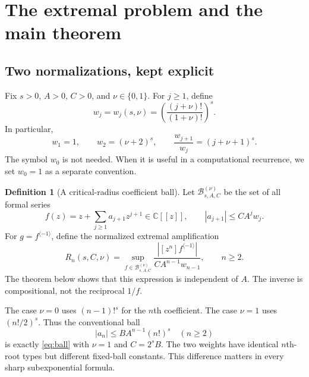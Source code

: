 \documentclass[11pt,a4paper]{article}
\theoremstyle{definition}
\newtheorem{definition}[theorem]{Definition}
\theoremstyle{remark}
\newcommand{\C}{\mathbb C}
\newcommand{\inv}{^{\langle-1\rangle}}
\numberwithin{equation}{section}
\begin{document}
\section{The extremal problem and the main theorem}\label{sec:main}

\subsection{Two normalizations, kept explicit}
Fix $s>0$, $A>0$, $C>0$, and $\nu\in\{0,1\}$. For $j\ge1$, define
\begin{equation}
 w_j=w_j(s,\nu)=
 \left(\frac{(j+\nu)!}{(1+\nu)!}\right)^s.
 \label{eq:weights}
\end{equation}
In particular,
\begin{equation}
 w_1=1,\qquad w_2=(\nu+2)^s,\qquad
 \frac{w_{j+1}}{w_j}=(j+\nu+1)^s.
 \label{eq:ratios}
\end{equation}
The symbol $w_0$ is not needed. When it is useful in a computational
recurrence, we set $w_0=1$ as a separate convention.

\begin{definition}[A critical-radius coefficient ball]
Let $\mathcal B_{s,A,C}^{(\nu)}$ be the set of all formal series
\begin{equation}
 f(z)=z+\sum_{j\ge1}a_{j+1}z^{j+1}\in\C[[z]],\qquad
 |a_{j+1}|\le C A^j w_j.
 \label{eq:ball}
\end{equation}
For $g=f\inv$, define the normalized extremal amplification
\begin{equation}
 R_n(s,C,\nu)=
 \sup_{f\in\mathcal B_{s,A,C}^{(\nu)}}
 \frac{|[z^n]f\inv|}{C A^{n-1}w_{n-1}},\qquad n\ge2.
 \label{eq:extremum}
\end{equation}
The theorem below shows that this expression is independent of $A$.
The inverse is compositional, not the reciprocal $1/f$.
\end{definition}

The case $\nu=0$ uses $(n-1)!^s$ for the $n$th coefficient. The case
$\nu=1$ uses $(n!/2)^s$. Thus the conventional ball
\begin{equation}
 |a_n|\le B A^{n-1}(n!)^s\quad(n\ge2)
 \label{eq:standardball}
\end{equation}
is exactly \eqref{eq:ball} with $\nu=1$ and $C=2^sB$.
The two weights have identical $n$th-root types but different fixed-ball
constants. This difference matters in every sharp subexponential formula.
\end{document}

